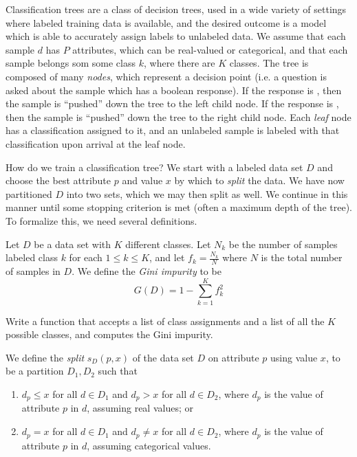 
Classification trees are a class of decision trees, used in a wide variety of settings where labeled training data is available, and the desired outcome is a model which is able to accurately assign labels to unlabeled data. We assume that each sample $d$ has $P$ attributes, which can be real-valued or categorical, and that each sample belongs som some class $k$, where there are $K$ classes. The tree is composed of many \emph{nodes}, which represent a decision point (i.e. a question is asked about the sample which has a boolean response). If the response is , then the sample is ``pushed'' down the tree to the left child node. If the response is , then the sample is ``pushed'' down the tree to the right child node. Each \emph{leaf} node has a classification assigned to it, and an unlabeled sample is labeled with that classification upon arrival at the leaf node.

How do we train a classification tree? We start with a labeled data set $D$ and choose the best attribute $p$ and value $x$ by which to \emph{split} the data. We have now partitioned $D$ into two sets, which we may then split as well. We continue in this manner until some stopping criterion is met (often a maximum depth of the tree). To formalize this, we need several definitions.

\begin{definition}
Let $D$ be a data set with $K$ different classes. Let $N_{k}$ be the number of samples labeled class $k$ for each $1 \leq k \leq K$, and let $f_{k} = \frac{N_{k}}{N}$ where $N$ is the total number of samples in $D$. We define the \emph{Gini impurity} to be 
\begin{equation*}
G(D) = 1 - \sum_{k=1}^{K} f_{k}^{2}
\end{equation*}
\end{definition}

\begin{problem}
Write a function that accepts a list of class assignments and a list of all the $K$ possible classes, and computes the Gini impurity.
\end{problem}

\begin{definition}
We define the \emph{split} $s_{D}(p,x)$ of the data set $D$ on attribute $p$ using value $x$, to be a partition $D_{1},D_{2}$ such that 
\begin{enumerate}
	\item $d_{p} \leq x$ for all $d \in D_{1}$ and $d_{p} > x$ for all $d \in D_{2}$, where $d_{p}$ is the value of attribute $p$ in $d$, assuming real values; or \\
	\item $d_{p} = x$ for all $d \in D_{1}$ and $d_{p} \neq x$ for all $d \in D_{2}$, where $d_{p}$ is the value of attribute $p$ in $d$, assuming categorical values.
\end{enumerate}
\end{definition}

